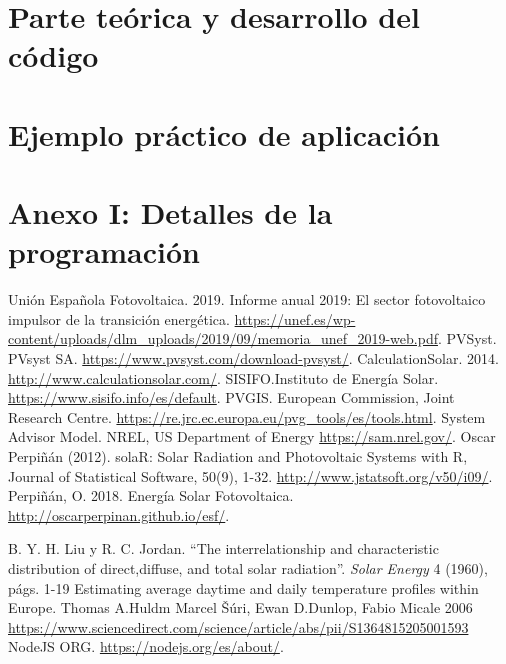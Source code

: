 \documentclass[11pt]{report}
\begin{document}
\chapter{Parte teórica y desarrollo del código}
\label{sec:theory}


\chapter{Ejemplo práctico de aplicación}


\appendix
\chapter{Anexo I: Detalles de la programación}


\pagebreak

\begin{thebibliography}{99}

 Unión Española Fotovoltaica. 2019. Informe anual 2019: El sector fotovoltaico impulsor de la transición energética. \url{https://unef.es/wp-content/uploads/dlm_uploads/2019/09/memoria_unef_2019-web.pdf}.  
 PVSyst. PVsyst SA.  \url{https://www.pvsyst.com/download-pvsyst/}.  
 CalculationSolar. 2014. \url{http://www.calculationsolar.com/}.
 SISIFO.Instituto de Energía Solar.  \url{https://www.sisifo.info/es/default}.  
 PVGIS. European Commission, Joint Research Centre. \url{https://re.jrc.ec.europa.eu/pvg_tools/es/tools.html}.  
 System Advisor Model. NREL, US Department of Energy \url{https://sam.nrel.gov/}.
   Oscar Perpiñán (2012). solaR: Solar Radiation and Photovoltaic
  Systems with R, Journal of Statistical Software, 50(9), 1-32. \url{http://www.jstatsoft.org/v50/i09/}.  
 Perpiñán, O. 2018. Energía Solar Fotovoltaica. \url{http://oscarperpinan.github.io/esf/}.

B. Y. H. Liu y R. C. Jordan. “The interrelationship and characteristic distribution of direct,diffuse, and total solar radiation”. \textit{Solar Energy} 4 (1960), págs. 1-19
 Estimating average daytime and daily temperature profiles within Europe.  Thomas A.Huldm Marcel Šúri, Ewan D.Dunlop, Fabio Micale 2006  \url{https://www.sciencedirect.com/science/article/abs/pii/S1364815205001593}
 NodeJS ORG.  \url{https://nodejs.org/es/about/}.  

\end{thebibliography}
\end{document}
